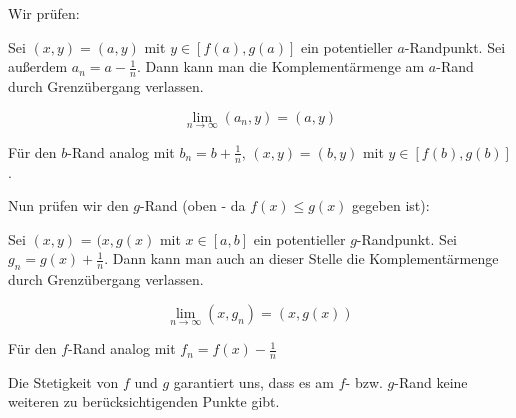 \documentclass[a4paper,german,12pt,smallheadings]{scrartcl}
\begin{document}
Wir prüfen:

Sei $(x,y) = (a,y)$ mit $y \in [f(a), g(a)]$ ein potentieller $a$-Randpunkt.
Sei außerdem $a_n = a - \frac{1}{n}$. Dann kann man die Komplementärmenge am
$a$-Rand durch Grenzübergang verlassen.

\begin{equation*}
  \lim_{n \to \infty} (a_n, y) = (a, y)
\end{equation*}

Für den $b$-Rand analog mit $b_n = b + \frac{1}{n}$, $(x,y) = (b,y)$ mit $y \in
[f(b), g(b)]$.

Nun prüfen wir den $g$-Rand (oben - da $f(x) \le g(x)$ gegeben ist):

Sei $(x,y)$ = $(x, g(x)$ mit $x \in [a,b]$ ein potentieller $g$-Randpunkt. Sei
$g_n = g(x) + \frac{1}{n}$. Dann kann man auch an dieser Stelle die
Komplementärmenge durch Grenzübergang verlassen.

\begin{equation*}
  \lim_{n \to \infty} (x, g_n) = (x, g(x))
\end{equation*}

Für den $f$-Rand analog mit $f_n = f(x) - \frac{1}{n}$

Die Stetigkeit von $f$ und $g$ garantiert uns, dass es am $f$- bzw. $g$-Rand
keine weiteren zu berücksichtigenden Punkte gibt.
\end{document}
